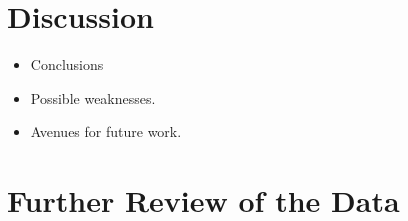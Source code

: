 \documentclass[11pt]{article}
\begin{document}
\section{Discussion}

\begin{itemize}
    \item Conclusions
    \item Possible weaknesses.
    \item Avenues for future work.
\end{itemize}



\appendix

\section{Further Review of the Data}
\end{document}

